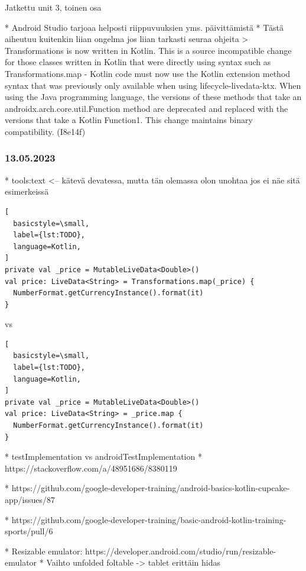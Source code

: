 Jatkettu unit 3, toinen osa

* Android Studio tarjoaa helposti riippuvuuksien yms. päivittämistä
  * Tästä aiheutuu kuitenkin liian ongelma jos liian tarkasti seuraa ohjeita
  > Transformations is now written in Kotlin. This is a source incompatible change for those classes written in Kotlin that were directly using syntax such as Transformations.map - Kotlin code must now use the Kotlin extension method syntax that was previously only available when using lifecycle-livedata-ktx. When using the Java programming language, the versions of these methods that take an androidx.arch.core.util.Function method are deprecated and replaced with the versions that take a Kotlin Function1. This change maintains binary compatibility. (I8e14f)

\subsubsection{13.05.2023}

* tools:text <-- kätevä devatessa, mutta tän olemassa olon unohtaa jos ei näe sitä esimerkeissä

\begin{lstlisting}[
  basicstyle=\small,
  label={lst:TODO},
  language=Kotlin,
]
private val _price = MutableLiveData<Double>()
val price: LiveData<String> = Transformations.map(_price) {
  NumberFormat.getCurrencyInstance().format(it)
}
\end{lstlisting}

vs

\begin{lstlisting}[
  basicstyle=\small,
  label={lst:TODO},
  language=Kotlin,
]
private val _price = MutableLiveData<Double>()
val price: LiveData<String> = _price.map {
  NumberFormat.getCurrencyInstance().format(it)
}
\end{lstlisting}

* testImplementation vs androidTestImplementation
* https://stackoverflow.com/a/48951686/8380119

* https://github.com/google-developer-training/android-basics-kotlin-cupcake-app/issues/87

* https://github.com/google-developer-training/basic-android-kotlin-training-sports/pull/6

* Resizable emulator: https://developer.android.com/studio/run/resizable-emulator
* Vaihto unfolded foltable -> tablet erittäin hidas

